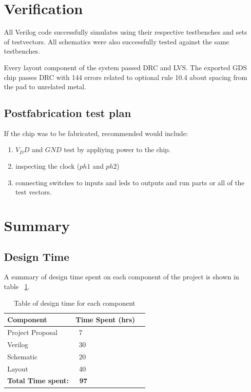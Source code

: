 \documentclass[]{article}
\begin{document}
\section{Verification}
\label{sec:verification}

All Verilog code successfully simulates using their respective testbenches and sets of testvectors. All schematics were also successfully tested against the same testbenches.

Every layout component of the system passed DRC and LVS. The exported GDS chip passes DRC with 144 errors related to optional rule 10.4 about spacing from the pad to unrelated metal. 

\subsection{Postfabrication test plan}
If the chip was to be fabricated, recommended would include:
\begin{enumerate}
\item $V_DD$ and $GND$ test by appliying power to the chip.
\item inspecting the clock ($ph1$ and $ph2$)
\item connecting switches to inputs and leds to outputs and run parts or all of the test vectors.
\end{enumerate}

\section{Summary}
\label{sec:summary}


\subsection{Design Time}
\label{sec:designtime}
A summary of design time spent on each component of the project is shown in table ~\ref{tab:designtime}.

\begin{table}[H]
\centering
\caption{Table of design time for each component}
\begin{tabular}{ | l | l | l |}
\hline
    Component              & Time Spent (hrs) \\
\hline
    Project Proposal        & ~7 \\
\hline
    Verilog                 & ~30\\
\hline
    Schematic               & ~20\\
\hline
    Layout                  & ~40\\
\hline
    \textbf{Total Time spent:}& \textbf{~97} \\
\hline
\end{tabular}

\label{tab:designtime}
\end{table}
\end{document}

